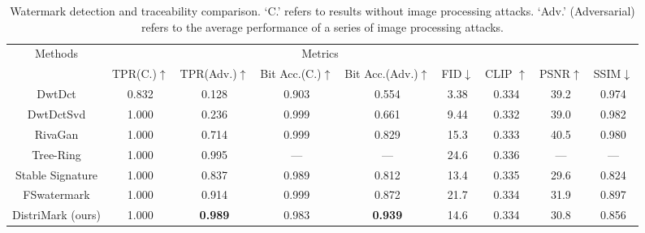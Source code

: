 \begin{table*}[]
\centering
\begin{tabular}{ccccccccc}
\hline

\multicolumn{1}{c}{\multirow{2}{*}{Methods}} & \multicolumn{6}{c}{Metrics}                                                                \\\hhline{|~|--------|}
\multicolumn{1}{c}{}                         & TPR(C.)$\uparrow$ & TPR(Adv.)$\uparrow$ & Bit Acc.(C.)$\uparrow$ & Bit Acc.(Adv.)$\uparrow $& FID$\downarrow $& CLIP $\uparrow$&PSNR$\uparrow$&SSIM$\downarrow$\\\hline
DwtDct        & 0.832 & 0.128  & 0.903   &  0.554   & 3.38 & 0.334 &39.2&0.974\\
DwtDctSvd     & 1.000 & 0.236  &  0.999   &  0.661   & 9.44 & 0.332 &39.0&0.982\\
RivaGan       & 1.000 & 0.714 & 0.999    & 0.829    & 15.3 & 0.333 &40.5&0.980\\
Tree-Ring     & 1.000 & 0.995 & --- & --- & 24.6 & 0.336 &---&---\\
Stable Signature &1.000  & 0.837 &  0.989   &     0.812& 13.4 & 0.335 &29.6&0.824\\
FSwatermark      & 1.000 & 0.914 &  0.999   &  0.872   & 21.7 & 0.334 &31.9&0.897\\
DistriMark (ours)  & 1.000 & \textbf{0.989} &  0.983   & \textbf{0.939}   & 14.6 &  0.334&30.8&0.856\\\hline
\end{tabular}
\caption{Watermark detection and traceability comparison. `C.' refers to results without image processing attacks. `Adv.' (Adversarial) refers to the average performance of a series of image processing attacks.}
\label{tab3:performance}
\end{table*}

